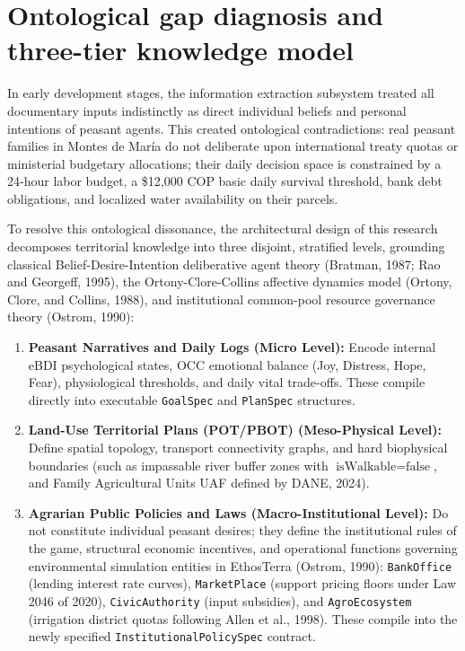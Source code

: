 \documentclass[11pt,a4paper]{article}
\begin{document}
\section{Ontological gap diagnosis and three-tier knowledge model}

In early development stages, the information extraction subsystem treated all documentary inputs indistinctly as direct individual beliefs and personal intentions of peasant agents. This created ontological contradictions: real peasant families in Montes de Mar\'ia do not deliberate upon international treaty quotas or ministerial budgetary allocations; their daily decision space is constrained by a 24-hour labor budget, a \$12,000 COP basic daily survival threshold, bank debt obligations, and localized water availability on their parcels.

To resolve this ontological dissonance, the architectural design of this research decomposes territorial knowledge into three disjoint, stratified levels, grounding classical Belief-Desire-Intention deliberative agent theory (Bratman, 1987; Rao and Georgeff, 1995), the Ortony-Clore-Collins affective dynamics model (Ortony, Clore, and Collins, 1988), and institutional common-pool resource governance theory (Ostrom, 1990):

\begin{enumerate}[leftmargin=*]
    \item \textbf{Peasant Narratives and Daily Logs (Micro Level):} Encode internal eBDI psychological states, OCC emotional balance (Joy, Distress, Hope, Fear), physiological thresholds, and daily vital trade-offs. These compile directly into executable \texttt{GoalSpec} and \texttt{PlanSpec} structures.
    \item \textbf{Land-Use Territorial Plans (POT/PBOT) (Meso-Physical Level):} Define spatial topology, transport connectivity graphs, and hard biophysical boundaries (such as impassable river buffer zones with $\text{isWalkable} = \text{false}$, and Family Agricultural Units UAF defined by DANE, 2024).
    \item \textbf{Agrarian Public Policies and Laws (Macro-Institutional Level):} Do not constitute individual peasant desires; they define the institutional rules of the game, structural economic incentives, and operational functions governing environmental simulation entities in EthosTerra (Ostrom, 1990): \texttt{BankOffice} (lending interest rate curves), \texttt{MarketPlace} (support pricing floors under Law 2046 of 2020), \texttt{CivicAuthority} (input subsidies), and \texttt{AgroEcosystem} (irrigation district quotas following Allen et al., 1998). These compile into the newly specified \texttt{InstitutionalPolicySpec} contract.
\end{enumerate}
\end{document}
